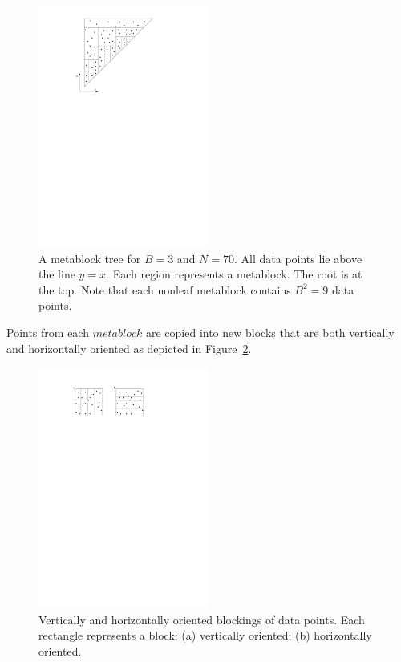 \documentclass[twoside,11pt,openright]{report}
\begin{document}
\begin{figure}[h]
	\centering
		\includegraphics[width=0.5\textwidth]{../figures/kanellakis_metablock_tree}
	\caption{A metablock tree for $B=3$ and $N=70$. All data points lie above the line $y=x$. Each region represents a metablock. The root is at the top. Note that each nonleaf metablock contains $B^2 = 9$ data points.}
	\label{fig:kanellakis_metablock_tree}
\end{figure}

Points from each $metablock$ are copied into new blocks that are both vertically and horizontally oriented as depicted in Figure~\ref{fig:kanellakis_vertical_horizontally_oriented_blocks}. 

\begin{figure}[h]
	\centering
		\includegraphics[width=0.5\textwidth]{../figures/kanellakis_vertical_horizontally_oriented_blocks}
	\caption{Vertically and horizontally oriented blockings of data points. Each rectangle represents a block: (a) vertically oriented; (b) horizontally oriented.}
	\label{fig:kanellakis_vertical_horizontally_oriented_blocks}
\end{figure}
\end{document}
